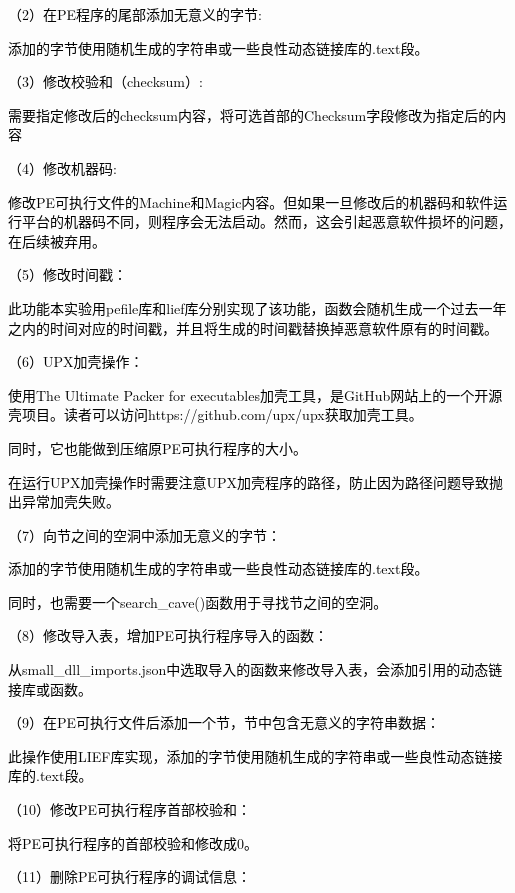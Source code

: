 \textcolor{black}{（2）在PE程序的尾部添加无意义的字节:}

\textcolor{black}{添加的字节使用随机生成的字符串或一些良性动态链接库的.text段。}

\textcolor{black}{（3）修改校验和（checksum）:}

\textcolor{black}{需要指定修改后的checksum内容，将可选首部的Checksum字段修改为指定后的内容}

\textcolor{black}{（4）修改机器码:}

\textcolor{black}{修改PE可执行文件的Machine和Magic内容。但如果一旦修改后的机器码和软件运行平台的机器码不同，则程序会无法启动。然而，这会引起恶意软件损坏的问题，在后续被弃用。}

\textcolor{black}{（5）修改时间戳：}

\textcolor{black}{此功能本实验用pefile库和lief库分别实现了该功能，函数会随机生成一个过去一年之内的时间对应的时间戳，并且将生成的时间戳替换掉恶意软件原有的时间戳。}

\textcolor{black}{（6）UPX加壳操作：}

\textcolor{black}{使用The Ultimate Packer for executables加壳工具，是GitHub网站上的一个开源壳项目。读者可以访问https://github.com/upx/upx获取加壳工具。}

\textcolor{black}{同时，它也能做到压缩原PE可执行程序的大小。}

\textcolor{black}{在运行UPX加壳操作时需要注意UPX加壳程序的路径，防止因为路径问题导致抛出异常加壳失败。}

\textcolor{black}{（7）向节之间的空洞中添加无意义的字节：}

\textcolor{black}{添加的字节使用随机生成的字符串或一些良性动态链接库的.text段。}

\textcolor{black}{同时，也需要一个search\_cave()函数用于寻找节之间的空洞。}

\textcolor{black}{（8）修改导入表，增加PE可执行程序导入的函数：}

\textcolor{black}{从small\_dll\_imports.json中选取导入的函数来修改导入表，会添加引用的动态链接库或函数。}

\textcolor{black}{（9）在PE可执行文件后添加一个节，节中包含无意义的字符串数据：}

\textcolor{black}{此操作使用LIEF库实现，添加的字节使用随机生成的字符串或一些良性动态链接库的.text段。}

\textcolor{black}{（10）修改PE可执行程序首部校验和：}

\textcolor{black}{将PE可执行程序的首部校验和修改成0。}

\textcolor{black}{（11）删除PE可执行程序的调试信息：}

